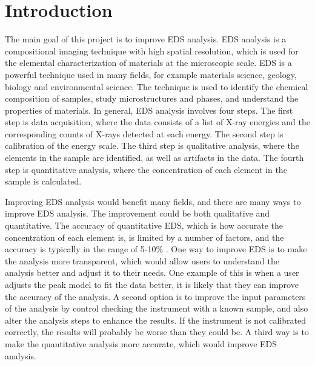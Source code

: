 \chapter{Introduction}
\label{chap:introduction}




The main goal of this project is to improve EDS analysis.
EDS analysis is a compositional imaging technique with high spatial resolution, which is used for the elemental characterization of materials at the microscopic scale.
EDS is a powerful technique used in many fields, for example materials science, geology, biology and environmental science.
The technique is used to identify the chemical composition of samples, study microstructures and phases, and understand the properties of materials.
In general, EDS analysis involves four steps.
The first step is data acquisition, where the data consists of a list of X-ray energies and the corresponding counts of X-rays detected at each energy.
The second step is calibration of the energy scale.
The third step is qualitative analysis, where the elements in the sample are identified, as well as artifacts in the data.
The fourth step is quantitative analysis, where the concentration of each element in the sample is calculated.



Improving EDS analysis would benefit many fields, and there are many ways to improve EDS analysis.
The improvement could be both qualitative and quantitative.
The accuracy of quantitative EDS, which is how accurate the concentration of each element is, is limited by a number of factors, and the accuracy is typically in the range of 5-10\% \cite{goldstein_scanning_2018,carter2016transmission}.
One way to improve EDS is to make the analysis more transparent, which would allow users to understand the analysis better and adjust it to their needs.
One example of this is when a user adjusts the peak model to fit the data better, it is likely that they can improve the accuracy of the analysis.
A second option is to improve the input parameters of the analysis by control checking the instrument with a known sample, and also alter the analysis steps to enhance the results.
If the instrument is not calibrated correctly, the results will probably be worse than they could be.
A third way is to make the quantitative analysis more accurate, which would improve EDS analysis.


